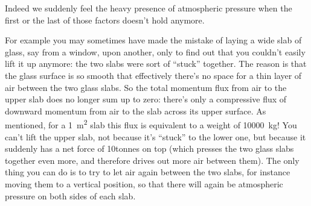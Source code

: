 \documentclass[a4paper,12pt,%
onecolumn,oneside,titlepage,%
british%
]{memoir}
\renewcommand*{\|}[1][]{\nonscript\:#1\vert\nonscript\:\mathopen{}}
\begin{document}
Indeed we suddenly feel the heavy presence of atmospheric pressure when the first or the last of those factors doesn't hold anymore.

For example you may sometimes have made the mistake of laying a wide slab of glass, say from a window, upon another, only to find out that you couldn't easily lift it up anymore: the two slabs were sort of \enquote{stuck} together.
%
%
The reason is that the glass surface is so smooth that effectively there's no space for a thin layer of air between the two glass slabs. So the total momentum flux from air to the upper slab does no longer sum up to zero: there's only a compressive flux of downward momentum from air to the slab across its upper surface. As mentioned, for a \qty{1}{m^2} slab this flux is equivalent to a weight of \qty{10000}{kg}! You can't lift the upper slab, not because it's \enquote{stuck} to the lower one, but because it suddenly has a net force of 10\:tonnes on top (which presses the two glass slabs together even more, and therefore drives out more air between them). The only thing you can do is to try to let air again between the two slabs, for instance moving them to a vertical position, so that there will again be atmospheric pressure on both sides of each slab.
\end{document}
